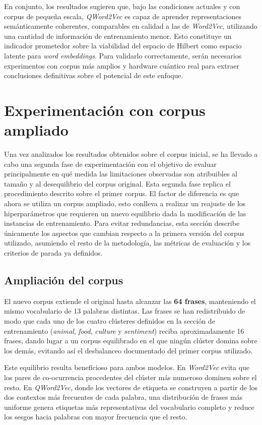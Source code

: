 En conjunto, los resultados sugieren que, bajo las condiciones actuales y con corpus de pequeña escala, \textit{QWord2Vec} es capaz de aprender representaciones semánticamente coherentes, comparables en calidad a las de \textit{Word2Vec}, utilizando una cantidad de información de entrenamiento menor. Esto constituye un indicador prometedor sobre la viabilidad del espacio de Hilbert como espacio latente para \textit{word embeddings}. Para validarlo correctamente, serán necesarios experimentos con corpus más amplios y hardware cuántico real para extraer conclusiones definitivas sobre el potencial de este enfoque.


\section{Experimentación con corpus ampliado}
\label{sec:experimentacion-v2}

Una vez analizados los resultados obtenidos sobre el corpus inicial, se ha llevado a cabo una segunda fase de experimentación con el objetivo de evaluar principalmente en qué medida las limitaciones observadas son atribuibles al tamaño y al desequilibrio del corpus original. Esta segunda fase replica el procedimiento descrito sobre el primer corpus. El factor de diferencia es que ahora se utiliza un corpus ampliado, esto conlleva a realizar un reajuste de los hiperparámetros que requieren un nuevo equilibrio dada la modificación de las instancias de entrenamiento. Para evitar redundancias, esta sección describe únicamente los aspectos que cambian respecto a la primera versión del corpus utilizado, asumiendo el resto de la metodología, las métricas de evaluación y los criterios de parada ya definidos.

\subsection{Ampliación del corpus}

El nuevo corpus extiende el original hasta alcanzar las \textbf{64 frases}, manteniendo el mismo vocabulario de 13 palabras distintas. Las frases se han redistribuido de modo que cada uno de los cuatro clústeres definidos en la sección de entrenamiento (\textit{animal}, \textit{food}, \textit{culture} y \textit{sentiment}) reciba aproximadamente 16 frases, dando lugar a un corpus equilibrado en el que ningún clúster domina sobre los demás, evitando así el desbalanceo documentado del primer corpus utilizado.

Este equilibrio resulta beneficioso para ambos modelos. En \textit{Word2Vec} evita que los pares de co-ocurrencia procedentes del clúster más numeroso dominen sobre el resto. En \textit{QWord2Vec}, donde los vectores de etiqueta se construyen a partir de los dos contextos más frecuentes de cada palabra, una distribución de frases más uniforme genera etiquetas más representativas del vocabulario completo y reduce los sesgos hacia palabras con mayor frecuencia que el resto.

